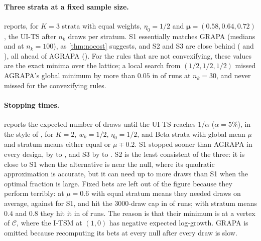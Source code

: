\documentclass[11pt]{article}
\newcommand{\bs}{\boldsymbol}
\newcommand{\calC}{\mathcal{C}}
\theoremstyle{plain}
\theoremstyle{definition}
\theoremstyle{remark}
\begin{document}
\paragraph{Three strata at a fixed sample size.}   reports, for $K=3$ strata with equal weights,
$\eta_0=1/2$ and $\bs\mu=(0.58,0.64,0.72)$, the UI-TS after $n_k$ draws per stratum.  S1 essentially matches GRAPA
(medians \kellyrefKthree{} and \grapaKthree{} at $n_k=100$), as \cref{thm:nocost} suggests, and S2 and S3 are close
behind (\taylorrefKthree{} and \upKthree{}), all ahead of AGRAPA (\agrapaKthree{}).  For the rules that are not
convexifying, these values are the exact minima over the lattice; a local search from $(1/2,1/2,1/2)$ missed AGRAPA's
global minimum by more than $0.05$ in \agrapamissshare{} of runs at $n_k=30$, and never missed for the convexifying rules.

\begin{table}[t]
  \centering\small
  \caption{$K=3$, $w_k=1/3$, $\eta_0=1/2$, $\bs\mu=(0.58,0.64,0.72)$, \repsB{} replications: median of
  $\min_{\bs\eta\in\calC}\log M_t(\bs\eta)$ after $n_k$ round-robin draws per stratum.}
  \label{tab:uits}
  
\end{table}

\paragraph{Stopping times.}   reports the expected number of draws until the UI-TS reaches $1/\alpha$
($\alpha=5\%$), in the style of \citet[Figure 3]{spertus2024sequential}, for $K=2$, $w_k=1/2$, $\eta_0=1/2$, and Beta
strata with global mean $\mu$ and stratum means either equal or $\mu\mp0.2$.  S1 stopped sooner than AGRAPA in every
design, by \fkellyvsagrapamin{} to \fkellyvsagrapamax{}, and S3 by \fupvsagrapamin{} to \fupvsagrapamax{}.  S2 is the
least consistent of the three: it is close to S1 when the alternative is near the null, where its quadratic
approximation is accurate, but it can need up to \ftaylorvskellymax{} more draws than S1 when the optimal fraction is
large.  Fixed bets are left out of the figure because they perform terribly: at $\mu=0.6$ with equal stratum means
they needed \ffixedtau{} draws on average, against \fkellytau{} for S1, and hit the $3000$-draw cap in \ffixedcens{} of runs;
with stratum means $0.4$ and $0.8$ they hit it in \ffixedgapcens{} of runs.  The reason is that their minimum is at a
vertex of $\calC$, where the I-TSM at $(1,0)$ has negative expected log-growth.  GRAPA is omitted because recomputing its bets at every null after every draw is slow.
\end{document}
